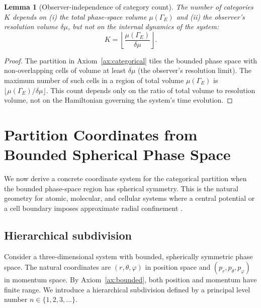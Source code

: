 \documentclass[11pt,twocolumn,a4paper]{article}
\newtheorem{lemma}[theorem]{Lemma}
\newcommand{\phasespace}{\Gamma}
\begin{document}
\begin{lemma}[Observer-independence of category count]\label{lem:observer_indep}
The number of categories $K$ depends on (i) the total phase-space volume $\mu(\phasespace_E)$ and (ii) the observer's resolution volume $\delta\mu$, but not on the internal dynamics of the system:
\begin{equation}\label{eq:Kcount}
K = \left\lfloor \frac{\mu(\phasespace_E)}{\delta\mu} \right\rfloor.
\end{equation}
\end{lemma}
\begin{proof}
The partition in Axiom~\ref{ax:categorical} tiles the bounded phase space with non-overlapping cells of volume at least $\delta\mu$ (the observer's resolution limit).
The maximum number of such cells in a region of total volume $\mu(\phasespace_E)$ is $\lfloor \mu(\phasespace_E)/\delta\mu \rfloor$.
This count depends only on the ratio of total volume to resolution volume, not on the Hamiltonian governing the system's time evolution.
\end{proof}


\section{Partition Coordinates from Bounded Spherical Phase Space}\label{sec:partition}

We now derive a concrete coordinate system for the categorical partition when the bounded phase-space region has spherical symmetry.
This is the natural geometry for atomic, molecular, and cellular systems where a central potential or a cell boundary imposes approximate radial confinement \citep{Griffiths2018,Sakurai2020}.

\subsection{Hierarchical subdivision}

Consider a three-dimensional system with bounded, spherically symmetric phase space.
The natural coordinates are $(r, \theta, \varphi)$ in position space and $(p_r, p_\theta, p_\varphi)$ in momentum space.
By Axiom~\ref{ax:bounded}, both position and momentum have finite range.
We introduce a hierarchical subdivision defined by a principal level number $n \in \{1, 2, 3, \ldots\}$.
\end{document}
